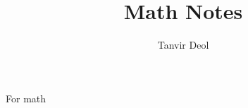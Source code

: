 \documentclass[]{article}
\title{\textbf{Math Notes}}
\author{Tanvir Deol}
\begin{document}
\maketitle 

\section{}
For math 
\end{document}
